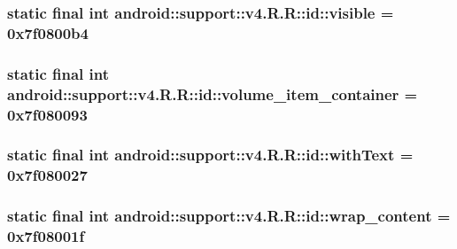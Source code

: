 \hypertarget{classandroid_1_1support_1_1v4_1_1_r_1_1id_ad5cd33cb0266fb810604994e17f3dbc}{
\subsubsection[{visible}]{\setlength{\rightskip}{0pt plus 5cm}static final int android::support::v4.R.R::id::visible = 0x7f0800b4}}
\label{classandroid_1_1support_1_1v4_1_1_r_1_1id_ad5cd33cb0266fb810604994e17f3dbc}


\hypertarget{classandroid_1_1support_1_1v4_1_1_r_1_1id_6c57df3484afc8f6738ef5fc85a30d30}{
\subsubsection[{volume\_\-item\_\-container}]{\setlength{\rightskip}{0pt plus 5cm}static final int android::support::v4.R.R::id::volume\_\-item\_\-container = 0x7f080093}}
\label{classandroid_1_1support_1_1v4_1_1_r_1_1id_6c57df3484afc8f6738ef5fc85a30d30}


\hypertarget{classandroid_1_1support_1_1v4_1_1_r_1_1id_9b2ad10196c2ca05edf3e8106ee2d2b7}{
\subsubsection[{withText}]{\setlength{\rightskip}{0pt plus 5cm}static final int android::support::v4.R.R::id::withText = 0x7f080027}}
\label{classandroid_1_1support_1_1v4_1_1_r_1_1id_9b2ad10196c2ca05edf3e8106ee2d2b7}


\hypertarget{classandroid_1_1support_1_1v4_1_1_r_1_1id_b4f07baa4e8af21329b1e69b7be9d6e4}{
\subsubsection[{wrap\_\-content}]{\setlength{\rightskip}{0pt plus 5cm}static final int android::support::v4.R.R::id::wrap\_\-content = 0x7f08001f}}
\label{classandroid_1_1support_1_1v4_1_1_r_1_1id_b4f07baa4e8af21329b1e69b7be9d6e4}




